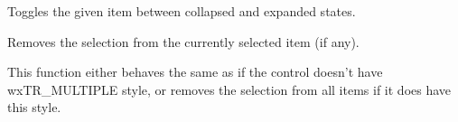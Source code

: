 \label{wxtreectrltoggle}


Toggles the given item between collapsed and expanded states.

\label{wxtreectrlunselect}


Removes the selection from the currently selected item (if any).

\label{wxtreectrlunselectall}


This function either behaves the same as 
if the control doesn't have wxTR\_MULTIPLE style, or removes the selection from
all items if it does have this style.

